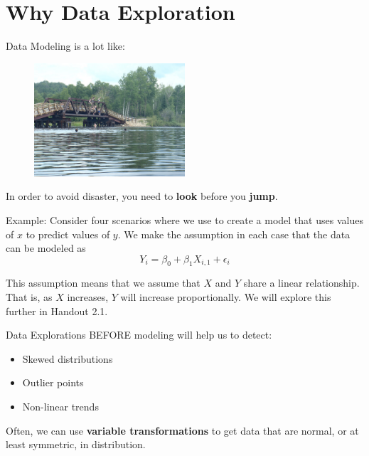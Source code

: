 \documentclass[12pt]{../notes}
\begin{document}


\section{Why Data Exploration}

Data Modeling is a lot like:

\begin{figure}[H]
\centering
\includegraphics[width=0.5\textwidth]{../figures/module1/bridgeJumping.jpg}
\end{figure}

In order to avoid disaster, you need to \textbf{look} before you \textbf{jump}.

\nspace
Example:
Consider four scenarios where we use to create a model that uses values of $x$ to predict values of $y$. We make the assumption in each case that the data can be modeled as
\begin{equation}
Y_i = \beta_0 + \beta_1X_{i,1} + \epsilon_i
\end{equation}

This assumption means that we assume that $X$ and $Y$ share a linear relationship. That is, as $X$ increases, $Y$ will increase proportionally. We will explore this further in Handout 2.1.

\nspace
Data Explorations BEFORE modeling will help us to detect:
\begin{itemize}
\item Skewed distributions
\item Outlier points
\item Non-linear trends
\end{itemize}

Often, we can use \textbf{variable transformations} to get data that are normal, or at least symmetric, in distribution.

\begin{minipage}[l][3cm][c]{\textwidth}
\end{minipage}
\end{document}
